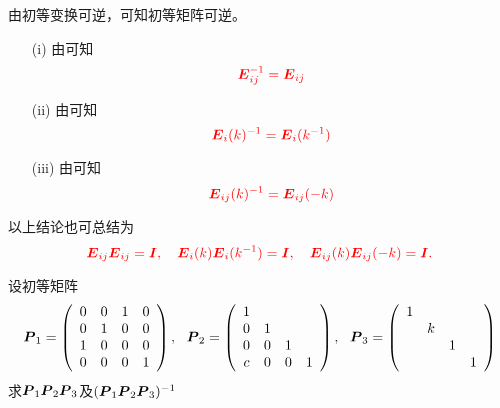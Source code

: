 \begin{frame}
  由初等变换可逆，可知初等矩阵可逆。  
  \begin{itemize}
  \item[(i)] 由可知
    $$
    \textcolor{red}{\boldsymbol{E}_{ij}^{-1} = \boldsymbol{E}_{ij}}
    $$ 
  \item[(ii)] 由可知
    $$
    \textcolor{red}{\boldsymbol{E}_{i}(k)^{-1} = \boldsymbol{E}_{i}(k^{-1})}
    $$ 
  \item[(iii)] 由可知
    $$
    \textcolor{red}{\boldsymbol{E}_{ij}(k)^{-1} = \boldsymbol{E}_{ij}(-k)}
    $$ 
  \end{itemize}
\end{frame}


\begin{frame}
  以上结论也可总结为
  $$ \textcolor{red}{
    \boldsymbol{E}_{ij}\boldsymbol{E}_{ij}=\boldsymbol{I}, \quad
    \boldsymbol{E}_{i}(k)\boldsymbol{E}_{i}(k^{-1}) = \boldsymbol{I}, \quad
    \boldsymbol{E}_{ij}(k)\boldsymbol{E}_{ij}(-k) = \boldsymbol{I}.
  }
  $$      
\end{frame}


\begin{frame}

  \begin{li} 
    设初等矩阵
    $$
    \begin{aligned}
      \boldsymbol{P}_1 = \left(
        \begin{array}{cccc}
          0&0&1&0 \\
          0&1&0&0 \\
          1&0&0&0 \\
          0&0&0&1
        \end{array}
      \right), ~~
      \boldsymbol{P}_2 = \left(
        \begin{array}{cccc}
          1& & &  \\
          0&1& &  \\
          0&0&1& \\
          c&0&0&1
        \end{array}
      \right), ~~
      \boldsymbol{P}_3 = \left(
        \begin{array}{cccc}
          1& & &  \\
           &k& &  \\
           & &1& \\
           & & &1
        \end{array}
      \right)
    \end{aligned}
    $$
    求$\boldsymbol{P}_1\boldsymbol{P}_2\boldsymbol{P}_3$及$(\boldsymbol{P}_1\boldsymbol{P}_2\boldsymbol{P}_3)^{-1}$
  \end{li}

\end{frame}


